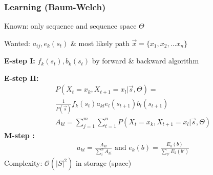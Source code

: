 \documentclass[main]{subfiles}
\begin{document}
\begin{landscape}
\begin{multicols}{4}
{\color{subsubsectionColor}\subsubsection{Learning (Baum-Welch)}}
Known: only sequence and sequence space $\Theta$

Wanted: $a_{ij}, e_k(s_t)$ \& most likely path $\vec{x} = \{x_1,x_2,\ldots x_n\}$

\textbf{E-step I:} $f_k(s_t), b_k(s_t)$ by forward \& backward algorithm

\textbf{E-step II:}
\begin{eqnarray}
P(X_t = x_k, X_{t+1} = x_l | \vec{s}, \Theta) = \\
 \frac{1}{P(\vec{s})} f_k(s_t) a_{kl} e_l(s_{t+1}) b_l(s_{t+1}) \\
A_{kl} = \sum\limits_{j=1}^m \sum\limits_{t=1}^n P(X_t = x_k, X_{t+1} = x_l | \vec{s}, \Theta)
\end{eqnarray}
\textbf{M-step :}
\begin{eqnarray}
a_{kl} = \frac{A_{kl}}{\sum\limits_i^n A_{ki}} \text{   and   } e_k(b) = \frac{E_k(b)}{\sum_{b'} E_k(b')}
\end{eqnarray}
Complexity: $\mathcal{O}(|S|^2)$ in storage (space)
\end{multicols}
\end{landscape}
\end{document}
